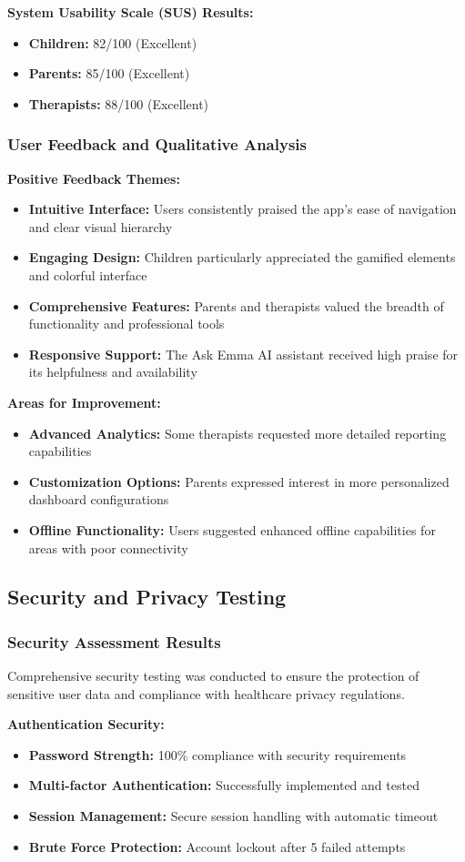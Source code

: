 ﻿\documentclass[12pt,a4paper]{article}
\newcommand{\sectiontitle}[1]{\subsection{#1}}
\newcommand{\subsectiontitle}[1]{\subsubsection{#1}}
\begin{document}
\textbf{System Usability Scale (SUS) Results:}
\begin{itemize}
    \item \textbf{Children:} 82/100 (Excellent)
    \item \textbf{Parents:} 85/100 (Excellent)
    \item \textbf{Therapists:} 88/100 (Excellent)
\end{itemize}

\subsectiontitle{User Feedback and Qualitative Analysis}

\textbf{Positive Feedback Themes:}
\begin{itemize}
    \item \textbf{Intuitive Interface:} Users consistently praised the app's ease of navigation and clear visual hierarchy
    \item \textbf{Engaging Design:} Children particularly appreciated the gamified elements and colorful interface
    \item \textbf{Comprehensive Features:} Parents and therapists valued the breadth of functionality and professional tools
    \item \textbf{Responsive Support:} The Ask Emma AI assistant received high praise for its helpfulness and availability
\end{itemize}

\textbf{Areas for Improvement:}
\begin{itemize}
    \item \textbf{Advanced Analytics:} Some therapists requested more detailed reporting capabilities
    \item \textbf{Customization Options:} Parents expressed interest in more personalized dashboard configurations
    \item \textbf{Offline Functionality:} Users suggested enhanced offline capabilities for areas with poor connectivity
\end{itemize}

\sectiontitle{Security and Privacy Testing}

\subsectiontitle{Security Assessment Results}

Comprehensive security testing was conducted to ensure the protection of sensitive user data and compliance with healthcare privacy regulations.

\textbf{Authentication Security:}
\begin{itemize}
    \item \textbf{Password Strength:} 100\% compliance with security requirements
    \item \textbf{Multi-factor Authentication:} Successfully implemented and tested
    \item \textbf{Session Management:} Secure session handling with automatic timeout
    \item \textbf{Brute Force Protection:} Account lockout after 5 failed attempts
\end{itemize}
\end{document}

